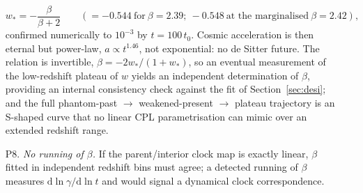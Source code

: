 \documentclass[11pt]{article}
\begin{document}
\begin{itemize}
\begin{equation}
w_* = -\frac{\beta}{\beta+2} \qquad (= -0.544 \ \text{for} \ \beta = 2.39;\ -0.548 \ \text{at the marginalised} \ \beta = 2.42),
\end{equation}
confirmed numerically to $10^{-3}$ by $t = 100\,t_0$. Cosmic acceleration is then eternal but power-law, $a \propto t^{1.46}$, not exponential: no de Sitter future. The relation is invertible, $\beta = -2w_*/(1+w_*)$, so an eventual measurement of the low-redshift plateau of $w$ yields an independent determination of $\beta$, providing an internal consistency check against the fit of Section~\ref{sec:desi}; and the full phantom-past $\to$ weakened-present $\to$ plateau trajectory is an S-shaped curve that no linear CPL parametrisation can mimic over an extended redshift range.
\item[P8.] \emph{No running of $\beta$.} If the parent/interior clock map is exactly linear, $\beta$ fitted in independent redshift bins must agree; a detected running of $\beta$ measures $\mathrm{d}\ln\gamma/\mathrm{d}\ln t$ and would signal a dynamical clock correspondence.

\end{itemize}
\end{document}
